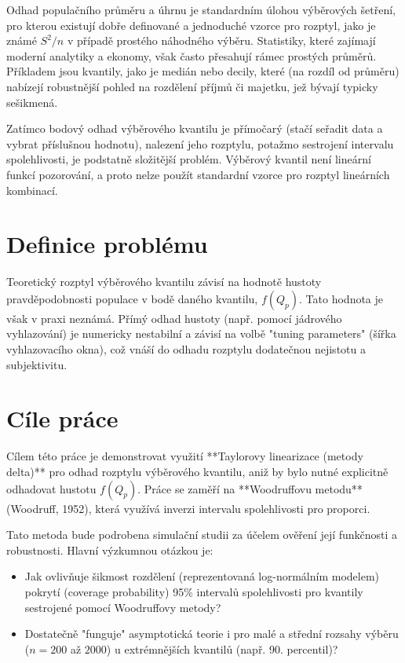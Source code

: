 Odhad populačního průměru a úhrnu je standardním úlohou výběrových šetření, pro kterou existují dobře definované a jednoduché vzorce pro rozptyl, jako je známé $S^2/n$ v případě prostého náhodného výběru. Statistiky, které zajímají moderní analytiky a ekonomy, však často přesahují rámec prostých průměrů. Příkladem jsou kvantily, jako je medián nebo decily, které (na rozdíl od průměru) nabízejí robustnější pohled na rozdělení příjmů či majetku, jež bývají typicky sešikmená.

Zatímco bodový odhad výběrového kvantilu je přímočarý (stačí seřadit data a vybrat příslušnou hodnotu), nalezení jeho rozptylu, potažmo sestrojení intervalu spolehlivosti, je podstatně složitější problém. Výběrový kvantil není lineární funkcí pozorování, a proto nelze použít standardní vzorce pro rozptyl lineárních kombinací.

\section*{Definice problému}
Teoretický rozptyl výběrového kvantilu závisí na hodnotě hustoty pravděpodobnosti populace v bodě daného kvantilu, $f(Q_p)$. Tato hodnota je však v praxi neznámá. Přímý odhad hustoty (např. pomocí jádrového vyhlazování) je numericky nestabilní a závisí na volbě "tuning parameters" (šířka vyhlazovacího okna), což vnáší do odhadu rozptylu dodatečnou nejistotu a subjektivitu.

\section*{Cíle práce}
Cílem této práce je demonstrovat využití **Taylorovy linearizace (metody delta)** pro odhad rozptylu výběrového kvantilu, aniž by bylo nutné explicitně odhadovat hustotu $f(Q_p)$. Práce se zaměří na **Woodruffovu metodu** (Woodruff, 1952), která využívá inverzi intervalu spolehlivosti pro proporci.

Tato metoda bude podrobena simulační studii za účelem ověření její funkčnosti a robustnosti. Hlavní výzkumnou otázkou je:
\begin{itemize}
    \item Jak ovlivňuje šikmost rozdělení (reprezentovaná log-normálním modelem) pokrytí (coverage probability) 95\% intervalů spolehlivosti pro kvantily sestrojené pomocí Woodruffovy metody?
    \item Dostatečně "funguje" asymptotická teorie i pro malé a střední rozsahy výběru ($n=200$ až $2000$) u extrémnějších kvantilů (např. 90. percentil)?
\end{itemize}
